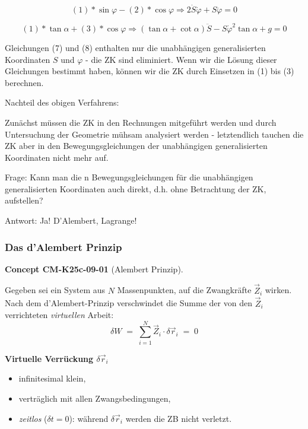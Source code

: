 \documentclass[10pt, letterpaper]{article}
\newcommand{\CustomHeading}[3]{%
  \par\medskip\noindent%
  \textbf{#1 #2} \textnormal{(#3)}.\enskip%
}
\newenvironment{CONC}[2]{\begin{unitbox}\CustomHeading{Concept}{#1}{#2}}{\end{unitbox}}
\begin{document}
\[(1) * \sin\varphi - (2) * \cos\varphi \Rightarrow  2\dot{S}\dot{\varphi} + S\ddot{\varphi} = 0 \tag{7}\]

\[(1) * \tan\alpha + (3) * \cos\varphi \Rightarrow  (\tan\alpha + \cot\alpha)\ddot{S} - S\dot{\varphi}^2\tan\alpha + g = 0 \tag{8}\]

Gleichungen (7) und (8) enthalten nur die unabhängigen generalisierten Koordinaten $S$ und $\varphi$ - die ZK sind eliminiert. Wenn wir die Lösung dieser Gleichungen bestimmt haben, können wir die ZK durch Einsetzen in (1) bis (3) berechnen.

Nachteil des obigen Verfahrens:

Zunächst müssen die ZK in den Rechnungen mitgeführt werden und durch Untersuchung der Geometrie mühsam analysiert werden - letztendlich tauchen die ZK aber in den Bewegungsgleichungen der unabhängigen generalisierten Koordinaten nicht mehr auf.

Frage: Kann man die n Bewegungsgleichungen für die unabhängigen generalisierten Koordinaten auch direkt, d.h. ohne Betrachtung der ZK, aufstellen?

Antwort: Ja! D'Alembert, Lagrange!




\pagebreak










\subsubsection{Das d'Alembert Prinzip}



\begin{CONC}{CM-K25c-09-01}{Alembert Prinzip}
Gegeben sei ein System aus $N$ Massenpunkten, auf die Zwangkräfte 
$\vec Z_i$ wirken.  
Nach dem d’Alembert-Prinzip verschwindet die Summe der von den 
$\vec Z_i$ verrichteten \emph{virtuellen} Arbeit:
\[
  \boxed{\;
    \delta W \;=\;\sum_{i=1}^{N}\vec Z_i\!\cdot\!\delta\vec r_i \;=\;0
  \;}
\]

\textbf{Virtuelle Verrückung $\delta\vec r_i$}
\begin{itemize}
  \item infinitesimal klein,
  \item verträglich mit allen Zwangsbedingungen,
  \item \emph{zeitlos} ($\delta t=0$): während $\delta\vec r_i$ werden 
        die ZB nicht verletzt.
\end{itemize}
\end{CONC}
\end{document}
